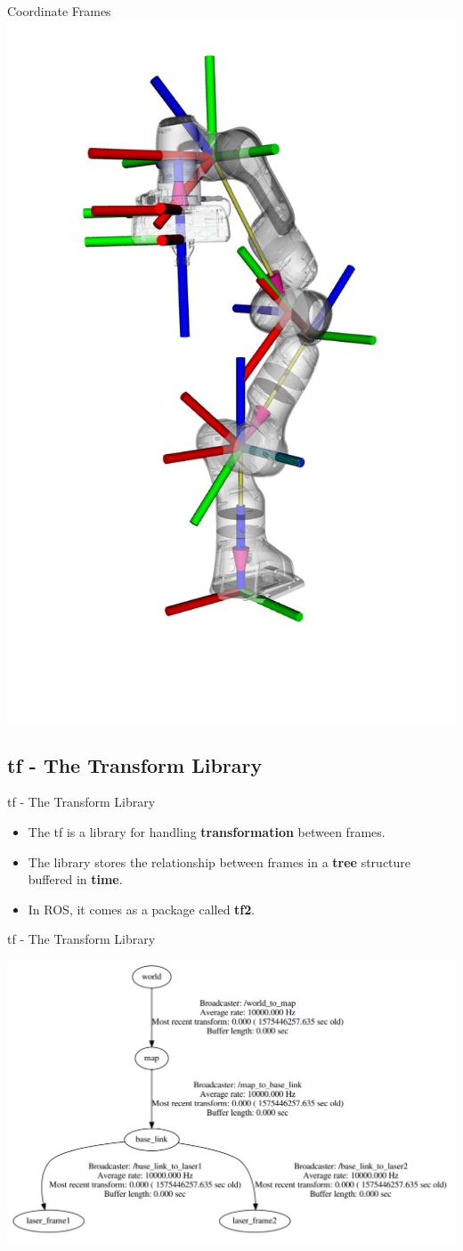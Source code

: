 \documentclass{beamer}
\begin{document}
\begin{frame}{Coordinate Frames} 
	\centering
	\includegraphics[width=.4\linewidth]{figures/panda_tf.png} 
\end{frame}

\subsection{tf - The Transform Library}
\begin{frame}{tf - The Transform Library} 
	\subtitle{Coordinate Frames}
	\begin{itemize}
	\item The tf is a library for handling \textbf{transformation} between frames. 
	\vspace{0.5cm}
	\item The library stores the relationship between frames in a \textbf{tree} structure buffered in \textbf{time}.
	\vspace{0.5cm}
	\item In ROS, it comes as a package called \textbf{tf2}.
\end{itemize}
\end{frame}

\begin{frame}{tf - The Transform Library} 
	\subtitle{Coordinate Frames}
	\centering
	\includegraphics[width=.9\linewidth]{figures/tf_tree.png} 
\end{frame}
\end{document}
